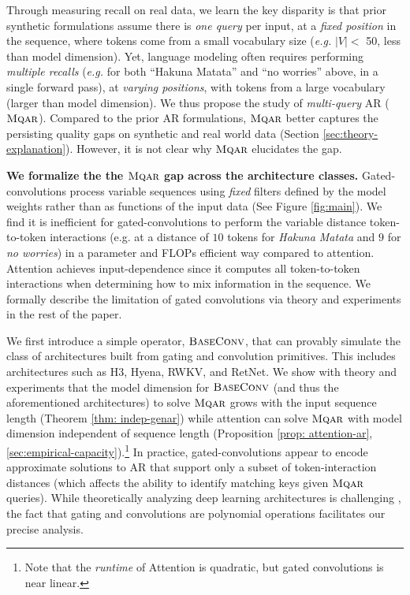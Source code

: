 Through measuring recall on real data, we learn the key disparity is that prior synthetic formulations assume there is \textit{one query} per input, at a \textit{fixed position} in the sequence, where tokens come from a small vocabulary size (\textit{e.g.} $|V| <$ 50, less than model dimension). Yet, language modeling often requires performing  \textit{multiple recalls} (\textit{e.g.} for both ``Hakuna Matata'' and ``no worries'' above, in a single forward pass), at \textit{varying positions}, with tokens from a large vocabulary  (larger than model dimension). We thus propose the study of \textit{multi-query} AR (${\textsc{Mqar}}$). 
Compared to the prior AR formulations, ${\textsc{Mqar}}$ better captures the persisting quality gaps on synthetic and real world data (Section \ref{sec:theory-explanation}). However, it is not clear why {$\textsc{Mqar}$} elucidates the gap.

\textbf{We formalize the the {$\textsc{Mqar}$} gap across the architecture classes.} Gated-convolutions process variable sequences using \textit{fixed} filters defined by the model weights rather than as functions of the input data (See Figure \ref{fig:main}).
We find it is inefficient for gated-convolutions to perform the variable distance token-to-token interactions (e.g. at a distance of $10$ tokens for \textit{Hakuna Matata} and $9$ for \textit{no worries}) in a parameter and FLOPs efficient way compared to attention. Attention achieves input-dependence since it computes all token-to-token interactions when determining how to mix information in the sequence. We formally describe the limitation of gated convolutions via theory and experiments in the rest of the paper. 

We first introduce a simple operator, ${\textsc{BaseConv}}$, that can provably simulate the class of architectures built from gating and convolution primitives. This includes architectures such as H3, Hyena, RWKV, and RetNet. We show with theory and experiments that the model dimension for ${\textsc{BaseConv}}$ (and thus the aforementioned architectures) to solve {$\textsc{Mqar}$} grows with the input sequence length (Theorem \ref{thm: indep-genar}) while attention can solve {$\textsc{Mqar}$} with model dimension independent of sequence length (Proposition \ref{prop: attention-ar}, \ref{sec:empirical-capacity}).\footnote{Note that the {\em runtime} of Attention is quadratic, but gated convolutions is near linear.} In practice, gated-convolutions appear to encode approximate solutions to AR that support only a subset of token-interaction distances (which affects the ability to identify matching keys given $\textsc{Mqar}$ queries). While theoretically analyzing deep learning architectures is challenging \citep{hahn2020theoretical, merrill2022saturated, keles2023on}, the fact that gating and convolutions are polynomial operations facilitates our precise analysis.

